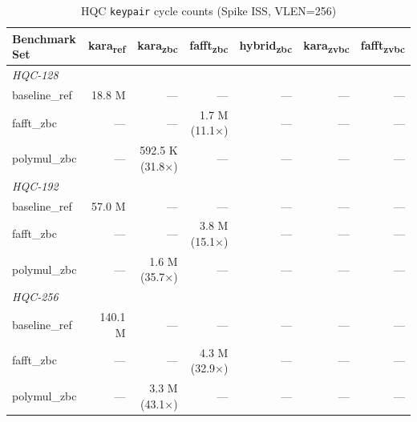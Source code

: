 
\begin{table}[h]
  \centering
  \caption{HQC \texttt{keypair} cycle counts (Spike ISS, VLEN=256)}
  \label{tab:keypair_counts}
  \begin{tabular}{lrrrrrr}
    \toprule
    Benchmark Set & kara\textsubscript{ref} & kara\textsubscript{zbc} & fafft\textsubscript{zbc} & hybrid\textsubscript{zbc} & kara\textsubscript{zvbc} & fafft\textsubscript{zvbc} \\
    \midrule
    \multicolumn{7}{l}{\textit{HQC-128}} \\
    baseline_ref & 18.8 M & — & — & — & — & — \\
    fafft_zbc & — & — & 1.7 M (11.1×) & — & — & — \\
    polymul_zbc & — & 592.5 K (31.8×) & — & — & — & — \\
    \multicolumn{7}{l}{\textit{HQC-192}} \\
    baseline_ref & 57.0 M & — & — & — & — & — \\
    fafft_zbc & — & — & 3.8 M (15.1×) & — & — & — \\
    polymul_zbc & — & 1.6 M (35.7×) & — & — & — & — \\
    \multicolumn{7}{l}{\textit{HQC-256}} \\
    baseline_ref & 140.1 M & — & — & — & — & — \\
    fafft_zbc & — & — & 4.3 M (32.9×) & — & — & — \\
    polymul_zbc & — & 3.3 M (43.1×) & — & — & — & — \\
    \bottomrule
  \end{tabular}
\end{table}

